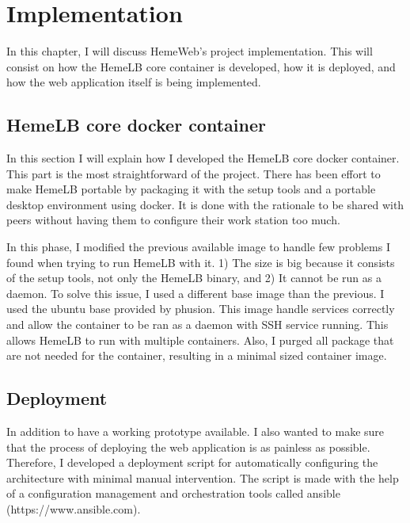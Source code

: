  

\chapter[Implementation]{Implementation}

In this chapter, I will discuss HemeWeb's project implementation. This will consist on how the HemeLB core container is developed, how it is deployed, and how the web application itself is being implemented.


\section{HemeLB core docker container}
In this section I will explain how I developed the HemeLB core docker container. This part is the most straightforward of the project. There has been effort to make HemeLB portable by packaging it with the setup tools and a portable desktop environment using docker. It is done with the rationale to be shared with peers without having them to configure their work station too much. 

In this phase, I modified the previous available image to handle few problems I found when trying to run HemeLB with it. 1) The size is big because it consists of the setup tools, not only the HemeLB binary, and 2) It cannot be run as a daemon. To solve this issue, I used a different base image than the previous. I used the ubuntu base provided by phusion. This image handle services correctly and allow the container to be ran as a daemon with SSH service running. This allows HemeLB to run with multiple containers. Also, I purged all package that are not needed for the container, resulting in a minimal sized container image.


\section{Deployment}

In addition to have a working prototype available. I also wanted to make sure that the process of deploying the web application is as painless as possible. Therefore, I developed a deployment script for automatically configuring the architecture with minimal manual intervention. The script is made with the help of a configuration management and orchestration tools called ansible (https://www.ansible.com).


